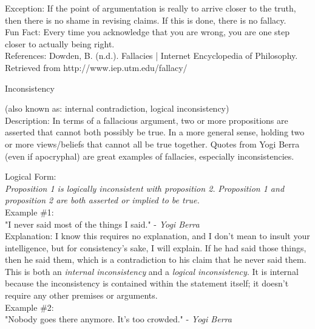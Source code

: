 \documentclass[a4paper,12pt,single,pdftex]{scrartcl}
\begin{document}
    
      Exception: If the point of argumentation is really to arrive closer to the truth, then there is no shame in revising claims.  If this is done, there is no fallacy.
    \\

    
      Fun Fact: Every time you acknowledge that you are wrong, you are one step closer to actually being right.
    \\

    References: Dowden, B. (n.d.). Fallacies | Internet Encyclopedia of Philosophy. Retrieved from http://www.iep.utm.edu/fallacy/
  

Inconsistency
    
      (also known as: internal contradiction, logical inconsistency)
    \\

  
    Description: In terms of a fallacious argument, two or more propositions are asserted that cannot both possibly be true.  In a more general sense, holding two or more views/beliefs that cannot all be true together.  Quotes from Yogi Berra (even if apocryphal) are great examples of fallacies, especially inconsistencies.

    
      Logical Form:
    \\

    
      {\em Proposition 1 is logically inconsistent with proposition 2.} \newline
{\em Proposition 1 and proposition 2 are both asserted or implied to be true.}
    \\

    
      Example \#1: 
    \\

    
      "I never said most of the things I said." - {\it Yogi Berra}
    \\

    
      Explanation: I know this requires no explanation, and I don't mean to insult your intelligence, but for consistency's sake, I will explain.  If he had said those things, then he said them, which is a contradiction to his claim that he never said them. This is both an {\it internal inconsistency} and a {\it logical inconsistency}. It is internal because the inconsistency is contained within the statement itself; it doesn't require any other premises or arguments.
    \\

    
      Example \#2: 
    \\

    
      "Nobody goes there anymore.  It's too crowded." - {\it Yogi Berra}
    \\
\end{document}
